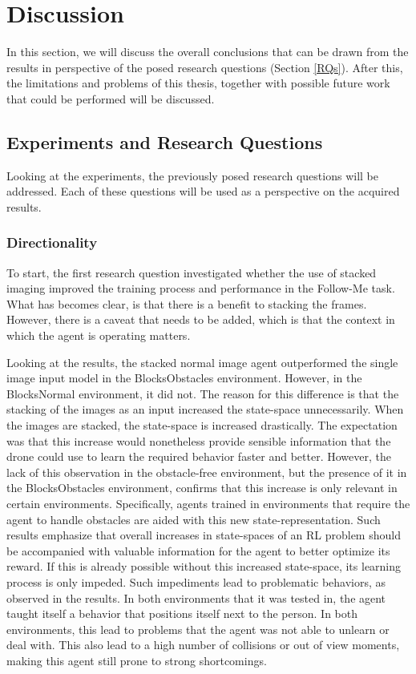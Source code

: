 

\section{Discussion}
In this section, we will discuss the overall conclusions that can be drawn from the 
results in perspective of the posed research questions (Section \ref{RQs}). 
After this, the limitations and problems of this thesis, 
together with possible future work that could be performed will be discussed. 

\subsection{Experiments and Research Questions}
Looking at the experiments, the previously posed research questions will be addressed. 
Each of these questions will be used as a perspective on the acquired results. 

\subsubsection{Directionality}
To start, the first research question investigated whether the use of stacked imaging 
improved the training process and performance in the Follow-Me task.
What has becomes clear, is that there is a benefit to stacking the frames. However, 
there is a caveat that needs to be added, which is that the context in which 
the agent is operating matters. 

Looking at the results, the stacked normal image 
agent outperformed the single image input model in the BlocksObstacles environment. 
However, in the BlocksNormal environment, it did not. The reason for this difference 
is that the stacking of the images as an input increased the state-space unnecessarily. 
When the images are stacked, the state-space is increased drastically. The 
expectation was that this increase would nonetheless provide sensible information that 
the drone could use to learn the required behavior faster and better. However, 
the lack of this observation in the obstacle-free environment, but the presence of it 
in the BlocksObstacles environment, confirms that this increase is only relevant 
in certain environments. Specifically, agents trained in environments that require 
the agent to handle obstacles are aided with this new state-representation. Such results 
emphasize that overall increases in state-spaces of an RL problem should be accompanied 
with valuable information for the agent to better optimize its reward. If this is already 
possible without this increased state-space, its learning process is only impeded. Such 
impediments lead to problematic behaviors, as observed in the results. In both 
environments that it was tested in, the agent taught itself a behavior that 
positions itself next to the person. In both environments, this lead to problems 
that the agent was not able to unlearn or deal with. This also lead to 
a high number of collisions or out of view moments, making this agent 
still prone to strong shortcomings. 

